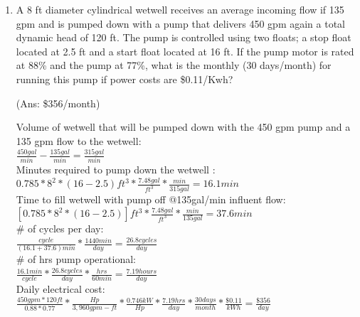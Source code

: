 \documentclass{article}
\begin{document}
\begin{enumerate}
\item A 8 ft diameter cylindrical wetwell receives an average incoming flow if 135 gpm and is pumped down with a pump that delivers 450 gpm again a total dynamic head of 120 ft.  The pump is controlled using two floats; a stop float located at 2.5 ft and a start float located at 16 ft.  If the pump motor is rated at 88\% and the pump at 77\%, what is the monthly (30 days/month) for running this pump if power costs are \$0.11/Kwh?\\
\vspace{0.6cm}

 (Ans:  \$356/month)


\vspace{0.4cm}
Volume of wetwell that will be pumped down with the 450 gpm pump and a 135 gpm flow to the wetwell:\\
$\frac{450gal}{min}-\frac{135gal}{min}=\frac{315gal}{min}$\\
\vspace{0.4cm}
Minutes required to pump down the wetwell :\\
$0.785*8^2*(16-2.5)ft^3*\frac{7.48gal}{ft^3}*\frac{min}{315gal}=\boxed{16.1min}$\\
\vspace{0.4cm}
Time to fill wetwell with pump off @135gal/min influent flow:
\\
$[0.785*8^2*(16-2.5)]ft^3*\frac{7.48gal}{ft^3}*\frac{min}{135gal}=37.6min$\\
\vspace{0.4cm}
\# of cycles per day:\\
$\frac{cycle}{(16.1+37.6)min}*\frac{1440min}{day}=\frac{26.8cycles}{day}$\\
\vspace{0.4cm}
\# of hrs pump operational:\\
$\frac{16.1min}{cycle}*\frac{26.8 cycles}{day}*\frac{hrs}{60min}=\frac{7.19hours}{day}$\\
\vspace{0.4cm}
Daily electrical cost:\\
$\frac{450gpm*120ft}{0.88*0.77}*\frac{Hp}{3,960 gpm-ft}*\frac{0.746kW}{Hp}*\frac{7.19hrs}{day}*\frac{30days}{month}*\frac{\$0.11}{kWh}=\boxed{\frac{\$356}{day}}$\\
\vspace{1cm}



\end{enumerate}
\end{document}
